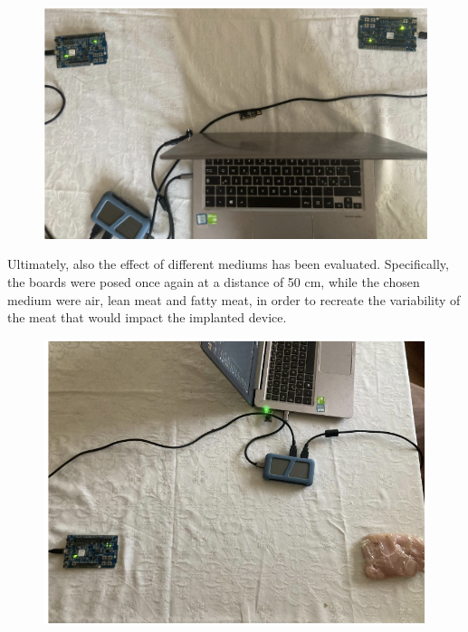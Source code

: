 \documentclass{Configuration_Files/PoliMi3i_thesis}
\begin{document}
\begin{figure}[H]
    \centering
    \includegraphics[scale=0.3]{Test_Procedure/21.png}
    \label{fig:direct_communication_board_PC}
\end{figure}

Ultimately, also the effect of different mediums has been evaluated. Specifically, the boards were posed once again at a distance of 50 cm, while the chosen medium were air, lean meat and fatty meat, in order to recreate the variability of the meat that would impact the implanted device.

\begin{figure}[H]
    \centering
    \includegraphics[scale=0.3]{Test_Procedure/22.png}
    \label{fig:direct_communication_board_PC}
\end{figure}
\end{document}
